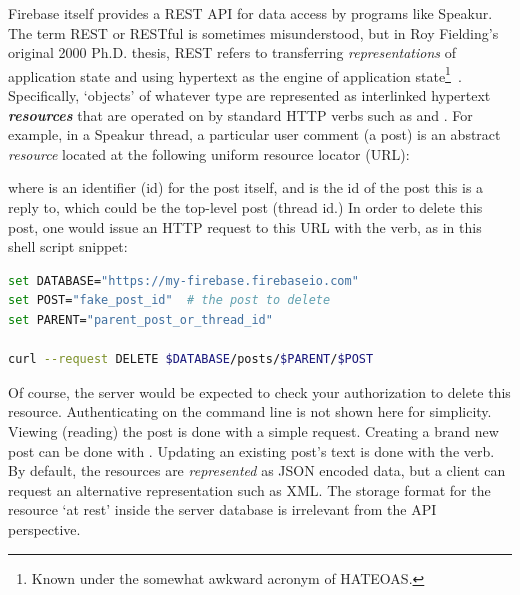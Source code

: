 Firebase itself provides a REST API for data access by programs like Speakur.
The term REST or RESTful is sometimes misunderstood,
but in Roy Fielding's original 2000 Ph.D. thesis, 
REST refers to transferring \textit{representations} of application state and using hypertext as the engine of 
application state\footnote{Known under the somewhat awkward acronym of HATEOAS.}~\cite{fielding2000}.
Specifically, `objects' of whatever type are represented as interlinked hypertext \textbf{\textit{resources}} that are operated on by standard HTTP verbs such as  and .
For example, in a Speakur thread, a particular user comment (a post) is an abstract \textit{resource} located at the following uniform resource locator (URL):



where  is an identifier (id) for the post itself, and  is the id of the post this is a reply to, 
which could be the top-level post (thread id.) 
In order to delete this post, one would issue an HTTP request to this URL with the  verb, as in this  shell script snippet:

\begin{lstlisting}[language=bash,caption=
{Deleting a post with the REST API.},label=l:rest_delete,captionpos=below]
set DATABASE="https://my-firebase.firebaseio.com"
set POST="fake_post_id"  # the post to delete
set PARENT="parent_post_or_thread_id"

curl --request DELETE $DATABASE/posts/$PARENT/$POST
\end{lstlisting}

Of course, the server would be expected to check your authorization to delete this resource.
Authenticating on the command line is not shown here for simplicity.
Viewing (reading) the post is done with a simple  request.
Creating a brand new post can be done with .
Updating an existing post's text is done with the  verb.
By default, the resources are \textit{represented} as JSON encoded data, 
but a client can request an alternative representation such as XML.
The storage format for the resource `at rest' inside the server database is irrelevant from the API perspective.


